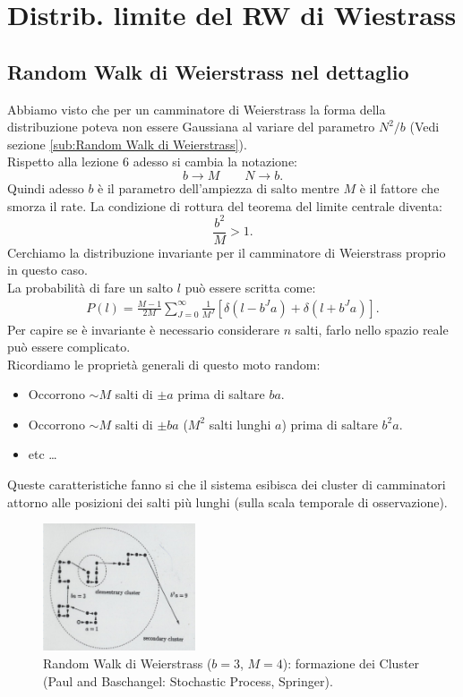 \section{Distrib. limite del RW di Wiestrass}%
\label{sub:Lezione 10}
\mylocaltoc
\subsection{Random Walk di Weierstrass nel dettaglio}%
\label{sub:Random Walk di Weierstrass nel dettaglio}
Abbiamo visto che per un camminatore di Weierstrass la forma della distribuzione poteva non essere Gaussiana al variare del parametro $N^2 / b$ (Vedi sezione \ref{sub:Random Walk di Weierstrass}). \\
Rispetto alla lezione 6 adesso si cambia la notazione:
\[
	b\to M \qquad  N \to b
.\]
Quindi adesso $b$ è il parametro dell'ampiezza di salto mentre $M$ è il fattore che smorza il rate. La condizione di rottura del teorema del limite centrale diventa:
\[
    \frac{b^2}{M} > 1
.\] 
Cerchiamo la distribuzione invariante per il camminatore di Weierstrass proprio in questo caso.\\
La probabilità di fare un salto $l$ può essere scritta come:
\[\begin{aligned}
    P(l) = \frac{M-1}{2M}\sum_{J=0}^{\infty} \frac{1}{M^J}\left[\delta (l-b^Ja) + \delta (l+b^Ja) \right]
.\end{aligned}\]
Per capire se è invariante è necessario considerare $n$ salti, farlo nello spazio reale può essere complicato.\\
Ricordiamo le proprietà generali di questo moto random:
\begin{itemize}
    \item Occorrono $\sim M$ salti di $\pm a$ prima di saltare $ba$.
    \item Occorrono $\sim M$ salti di $\pm ba$ ($M^2$ salti lunghi $a$) prima di saltare $b^2a$.
    \item etc \ldots
\end{itemize}
Queste caratteristiche fanno si che il sistema esibisca dei cluster di camminatori attorno alle posizioni dei salti più lunghi (sulla scala temporale di osservazione).
\begin{figure}[H]
    \centering
    \includegraphics[width=0.4\textwidth]{figures/10_RWWeierstrass.png}
    \caption{\scriptsize Random Walk di Weierstrass ($b=3$, $M=4$): formazione dei Cluster (Paul and Baschangel: Stochastic Process, Springer).}
    \label{fig:figures-10_RWWeierstrass-png}
\end{figure}
